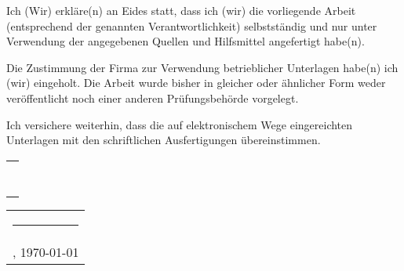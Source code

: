 \documentclass[../main.tex]{subfiles}
\begin{document}
        Ich (Wir) erkläre(n) an Eides statt, dass ich (wir) die vorliegende Arbeit (entsprechend
	der genannten Verantwortlichkeit) selbstständig und nur unter Verwendung der angegebenen
	Quellen und Hilfsmittel angefertigt habe(n).
	\medskip

	Die Zustimmung der Firma zur Verwendung betrieblicher Unterlagen habe(n) ich (wir)
	eingeholt. Die Arbeit wurde bisher in gleicher oder ähnlicher Form weder
	veröffentlicht noch einer anderen Prüfungsbehörde vorgelegt.
	\medskip

	Ich versichere weiterhin, dass die auf elektronischem Wege eingereichten Unterlagen
	mit den schriftlichen Ausfertigungen übereinstimmen.

	\vspace{15mm}
	\hfill%
	\begin{tabular}[t]{c}
		\rule{10em}{0.4pt}      \\
		\theauthor
	\end{tabular}%
	\hfill%
	\begin{tabular}[t]{c}
		\rule{10em}{0.4pt} \\
		\location, \today
	\end{tabular}%
	\hfill\strut
\end{document}
